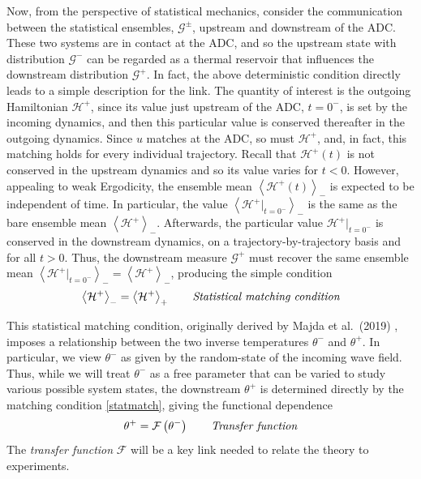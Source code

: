 \documentclass[11pt]{article}
\newcommand{\mean}[1]{\left< #1 \right>}
\newcommand{\Ham}{\mathcal{H}}
\newcommand{\Hdn}{\Ham^{+}}
\newcommand{\Gibbs}{\mathcal{G}}
\newcommand{\Gup}{\Gibbs^{-}}
\newcommand{\Gdn}{\Gibbs^{+}}
\newcommand{\Gupdn}{\Gibbs^{\pm}}
\newcommand{\thup}{\theta^{-}}
\newcommand{\thdn}{\theta^{+}}
\newcommand{\meanup}[1]{\mean{#1}_{-}}
\newcommand{\meandn}[1]{\mean{#1}_{+}}
\newcommand{\transf}{\mathcal{F}}
\begin{document}
	Now, from the perspective of statistical mechanics, consider the communication between the statistical ensembles, $\Gupdn$, upstream and downstream of the ADC. These two systems are in contact at the ADC, and so the upstream state with distribution $\Gup$ can be regarded as a thermal reservoir that influences the downstream distribution $\Gdn$. In fact, the above deterministic  condition directly leads to a simple description for the link. The quantity of interest is the outgoing Hamiltonian $\Hdn$, since its value just upstream of the ADC, $t=0^{-}$, is set by the incoming dynamics, and then this particular value is conserved thereafter in the outgoing dynamics. Since $u$ matches at the ADC, so must $\Hdn$, and, in fact, this matching holds for every individual trajectory. Recall that $\Hdn(t)$ is not conserved in the upstream dynamics and so its value varies for $t < 0$. However, appealing to weak Ergodicity, the ensemble mean $\meanup{\Hdn(t)}$ is expected to be independent of time. In particular, the value $\meanup{\Hdn \vert_{t=0^{-}} }$ is the same as the bare ensemble mean $\meanup{\Hdn}$. Afterwards, the particular value $\Hdn \vert_{t=0^{-}}$ is conserved in the downstream dynamics, on a trajectory-by-trajectory basis and for all $t>0$. Thus, the downstream measure $\Gdn$ must recover the same ensemble mean $\meanup{\Hdn \vert_{t=0^{-}} } = \meanup{\Hdn}$, producing the simple condition
\begin{align}
\label{statmatch}
\meanup{\Hdn} = \meandn{\Hdn}
\qquad \mbox{\em Statistical matching condition}
\end{align}

	This statistical matching condition, originally derived by Majda et al.~(2019) \cite{majda2019}, imposes a relationship between the two inverse temperatures $\thup$ and $\thdn$. In particular, we view $\thup$ as given by the random-state of the incoming wave field. Thus, while we will treat $\thup$ as a free parameter that can be varied to study various possible system states, the downstream $\thdn$ is determined directly by the matching condition \eqref{statmatch}, giving the functional dependence
\begin{equation}
\thdn = \transf \left( \thup \right)
\qquad \mbox{\em Transfer function}
\end{equation}
The {\em transfer function} $\transf$ will be a key link needed to relate the theory to experiments.
\end{document}
